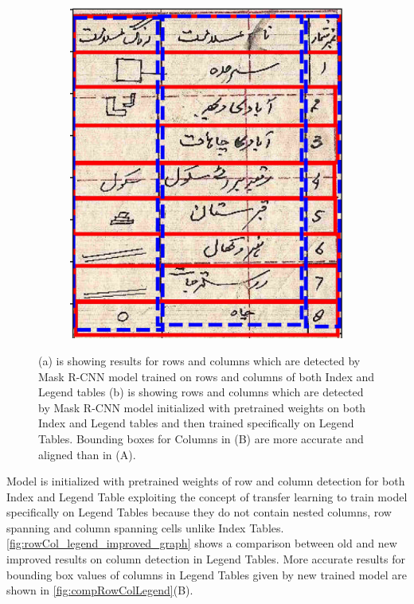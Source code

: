 \begin{figure}[h!]
\begin{subfigure}{0.47\linewidth}
  \includegraphics[width=\linewidth]{rowCol_1483__legend_improved.jpg}
    \caption{}
    \label{}
\end{subfigure}
\caption{(a) is showing results for rows and columns which are detected by Mask R-CNN model trained on rows and columns of both Index and Legend tables (b) is showing rows and columns which are detected by Mask R-CNN model initialized with pretrained weights on both Index and Legend tables and then trained specifically on Legend Tables. Bounding boxes for Columns in (B) are more accurate and aligned than in (A).}
\label{fig:compRowColLegend}
\end{figure}
Model is initialized with pretrained weights of row and column detection for both Index and Legend Table exploiting the concept of transfer learning to train model specifically on Legend Tables because they do not contain nested columns, row spanning and column spanning cells unlike Index Tables. \autoref{fig:rowCol_legend_improved_graph} shows a comparison between old and new improved results on column detection in Legend Tables. More accurate results for bounding box values of columns in Legend Tables given by new trained model are shown in \autoref{fig:compRowColLegend}(B).
